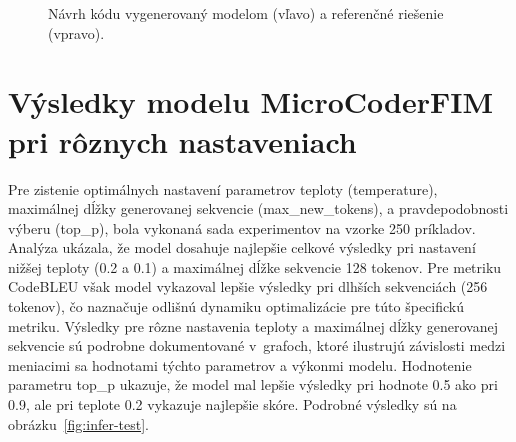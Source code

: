 \begin{figure}[H]
    \centering
    \caption{Návrh kódu vygenerovaný modelom \MCfim{} (vľavo) a referenčné riešenie (vpravo).}
    \label{fig:fim3}
\end{figure}


\chapter{Výsledky modelu MicroCoderFIM pri rôznych nastaveniach}\label{app:fim_test}

Pre zistenie optimálnych nastavení parametrov teploty (temperature), maximálnej dĺžky generovanej sekvencie (max\_new\_tokens), a pravdepodobnosti výberu (top\_p), bola vykonaná sada experimentov na vzorke 250 príkladov. Analýza ukázala, že model dosahuje najlepšie celkové výsledky pri nastavení nižšej teploty (0.2 a 0.1) a  maximálnej dĺžke sekvencie 128 tokenov. Pre metriku CodeBLEU však model vykazoval lepšie výsledky pri dlhších sekvenciách (256 tokenov), čo naznačuje odlišnú dynamiku optimalizácie pre túto špecifickú metriku. Výsledky pre rôzne nastavenia teploty a maximálnej dĺžky generovanej sekvencie sú podrobne dokumentované v~grafoch, ktoré ilustrujú závislosti medzi meniacimi sa hodnotami týchto parametrov a výkonmi modelu. Hodnotenie parametru top\_p ukazuje, že model mal lepšie výsledky pri hodnote 0.5 ako pri 0.9, ale pri teplote 0.2 vykazuje najlepšie skóre. Podrobné výsledky sú na obrázku~\ref{fig:infer-test}.

